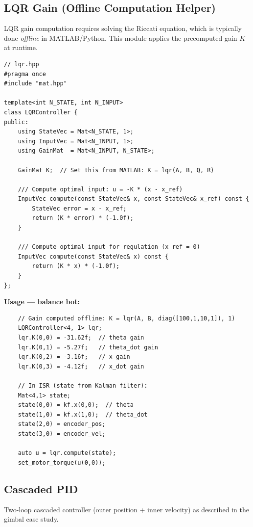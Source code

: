 \subsection{LQR Gain (Offline Computation Helper)}

LQR gain computation requires solving the Riccati equation, which is typically done \textit{offline} in MATLAB/Python. This module applies the precomputed gain $K$ at runtime.

\begin{verbatim}
// lqr.hpp
#pragma once
#include "mat.hpp"

template<int N_STATE, int N_INPUT>
class LQRController {
public:
    using StateVec = Mat<N_STATE, 1>;
    using InputVec = Mat<N_INPUT, 1>;
    using GainMat  = Mat<N_INPUT, N_STATE>;

    GainMat K;  // Set this from MATLAB: K = lqr(A, B, Q, R)

    /// Compute optimal input: u = -K * (x - x_ref)
    InputVec compute(const StateVec& x, const StateVec& x_ref) const {
        StateVec error = x - x_ref;
        return (K * error) * (-1.0f);
    }

    /// Compute optimal input for regulation (x_ref = 0)
    InputVec compute(const StateVec& x) const {
        return (K * x) * (-1.0f);
    }
};
\end{verbatim}

\textbf{Usage --- balance bot:}
\begin{verbatim}
    // Gain computed offline: K = lqr(A, B, diag([100,1,10,1]), 1)
    LQRController<4, 1> lqr;
    lqr.K(0,0) = -31.62f;  // theta gain
    lqr.K(0,1) = -5.27f;   // theta_dot gain
    lqr.K(0,2) = -3.16f;   // x gain
    lqr.K(0,3) = -4.12f;   // x_dot gain

    // In ISR (state from Kalman filter):
    Mat<4,1> state;
    state(0,0) = kf.x(0,0);  // theta
    state(1,0) = kf.x(1,0);  // theta_dot
    state(2,0) = encoder_pos;
    state(3,0) = encoder_vel;

    auto u = lqr.compute(state);
    set_motor_torque(u(0,0));
\end{verbatim}

\subsection{Cascaded PID}

Two-loop cascaded controller (outer position + inner velocity) as described in the gimbal case study.

